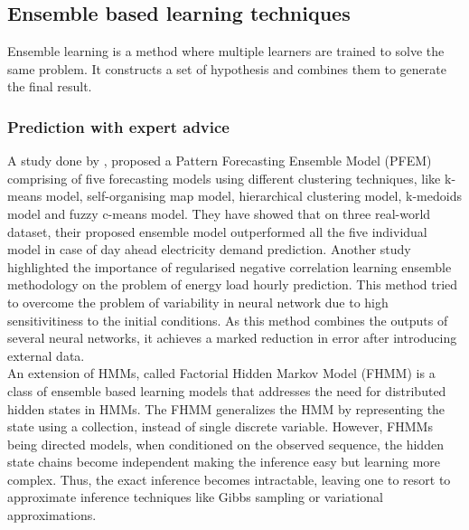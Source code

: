 \documentclass[runningheads,a4paper]{llncs}
\begin{document}
\subsection{Ensemble based learning techniques}
Ensemble learning is a method where multiple learners are trained to solve the same problem. It constructs a set of hypothesis and combines them to generate the final result.
\subsubsection{Prediction with expert advice}
A study done by \cite{Shen}, proposed a Pattern Forecasting Ensemble Model (PFEM) comprising of five forecasting models using different clustering techniques, like k-means model, self-organising map model, hierarchical clustering model, k-medoids model and fuzzy c-means model. They have showed that on three real-world dataset, their proposed ensemble model outperformed all the five individual model in case of day ahead electricity demand prediction.
Another study \cite{Felice} highlighted the importance of regularised negative correlation learning ensemble methodology on the problem of energy load hourly prediction. This method tried to overcome the problem of variability in neural network due to high sensitivitiness to the initial conditions. As this method combines the outputs of several neural networks, it achieves a marked reduction in error after introducing external data. \\
An extension of HMMs, called Factorial Hidden Markov Model (FHMM) \cite{fhmm} is a class of ensemble based learning models that addresses the need for distributed hidden states in HMMs. The FHMM generalizes the HMM by representing the state using a collection, instead of single discrete variable. However, FHMMs being directed models, when conditioned on the observed sequence, the hidden state chains become independent making the inference easy but learning more complex. Thus, the exact inference becomes intractable, leaving one to resort to approximate inference techniques like Gibbs sampling or variational approximations.


\end{document}
